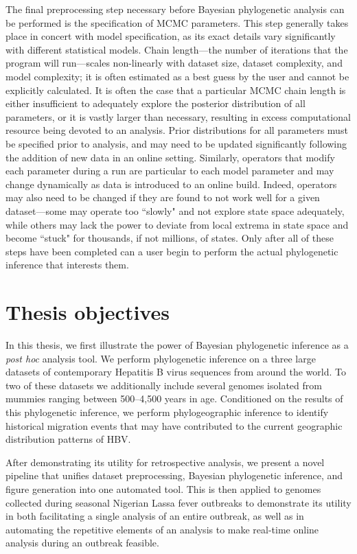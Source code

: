 The final preprocessing step necessary before Bayesian phylogenetic analysis can be performed is the specification of MCMC parameters.
This step generally takes place in concert with model specification, as its exact details vary significantly with different statistical models.
Chain length---the number of iterations that the program will run---scales non-linearly with dataset size, dataset complexity, and model complexity; it is often estimated as a best guess by the user and cannot be explicitly calculated.
It is often the case that a particular MCMC chain length is either insufficient to adequately explore the posterior distribution of all parameters, or it is vastly larger than necessary, resulting in excess computational resource being devoted to an analysis.
Prior distributions for all parameters must be specified prior to analysis, and may need to be updated significantly following the addition of new data in an online setting.
Similarly, operators that modify each parameter during a run are particular to each model parameter and may change dynamically as data is introduced to an online build.
Indeed, operators may also need to be changed if they are found to not work well for a given dataset---some may operate too ``slowly" and not explore state space adequately, while others may lack the power to deviate from local extrema in state space and become ``stuck" for thousands, if not millions, of states.
Only after all of these steps have been completed can a user begin to perform the actual phylogenetic inference that interests them.

\section{Thesis objectives}

In this thesis, we first illustrate the power of Bayesian phylogenetic inference as a \textit{post hoc} analysis tool.
We perform phylogenetic inference on a three large datasets of contemporary Hepatitis B virus sequences from around the world.
To two of these datasets we additionally include several genomes isolated from mummies ranging between 500--4,500 years in age.
Conditioned on the results of this phylogenetic inference, we perform phylogeographic inference to identify historical migration events that may have contributed to the current geographic distribution patterns of HBV.

After demonstrating its utility for retrospective analysis, we present a novel pipeline that unifies dataset preprocessing, Bayesian phylogenetic inference, and figure generation into one automated tool.
This is then applied to genomes collected during seasonal Nigerian Lassa fever outbreaks to demonstrate its utility in both facilitating a single analysis of an entire outbreak, as well as in automating the repetitive elements of an analysis to make real-time online analysis during an outbreak feasible.

